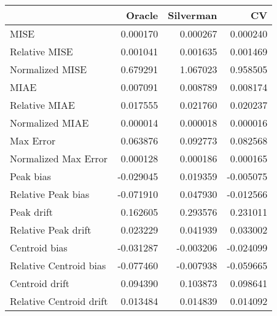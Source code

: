 \begin{tabular}{lrrr}
  \hline
 & Oracle & Silverman & CV \\ 
  \hline
MISE & 0.000170 & 0.000267 & 0.000240 \\ 
  Relative MISE & 0.001041 & 0.001635 & 0.001469 \\ 
  Normalized MISE & 0.679291 & 1.067023 & 0.958505 \\ 
  MIAE & 0.007091 & 0.008789 & 0.008174 \\ 
  Relative MIAE & 0.017555 & 0.021760 & 0.020237 \\ 
  Normalized MIAE & 0.000014 & 0.000018 & 0.000016 \\ 
  Max Error & 0.063876 & 0.092773 & 0.082568 \\ 
  Normalized Max Error & 0.000128 & 0.000186 & 0.000165 \\ 
  Peak bias & -0.029045 & 0.019359 & -0.005075 \\ 
  Relative Peak bias & -0.071910 & 0.047930 & -0.012566 \\ 
  Peak drift & 0.162605 & 0.293576 & 0.231011 \\ 
  Relative Peak drift & 0.023229 & 0.041939 & 0.033002 \\ 
  Centroid bias & -0.031287 & -0.003206 & -0.024099 \\ 
  Relative Centroid bias & -0.077460 & -0.007938 & -0.059665 \\ 
  Centroid drift & 0.094390 & 0.103873 & 0.098641 \\ 
  Relative Centroid drift & 0.013484 & 0.014839 & 0.014092 \\ 
   \hline
\end{tabular}
